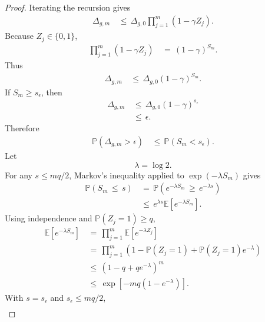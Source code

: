 \documentclass{article} %
\begin{document}
\begin{proof}
Iterating the recursion gives
\begin{align}
\label{eq:app-fifth-contract-proof-product}
\Delta_{g,m}
&\,\le\,
\Delta_{g,0}
\prod_{j=1}^{m}(1-\gamma Z_j).
\end{align}
Because \(Z_j\in\{0,1\}\),
\begin{align}
\label{eq:app-fifth-contract-proof-power}
\prod_{j=1}^{m}(1-\gamma Z_j)
&\,=\,
(1-\gamma)^{S_m}.
\end{align}
Thus
\begin{align}
\label{eq:app-fifth-contract-proof-gap}
\Delta_{g,m}
&\,\le\,
\Delta_{g,0}(1-\gamma)^{S_m}.
\end{align}
If \(S_m\ge s_\epsilon\), then
\begin{align}
\label{eq:app-fifth-contract-proof-success}
\Delta_{g,m}
&\,\le\,
\Delta_{g,0}(1-\gamma)^{s_\epsilon}
\\
&\,\le\,
\epsilon.
\end{align}
Therefore
\begin{align}
\label{eq:app-fifth-contract-proof-tail-start}
\mathbb{P}(\Delta_{g,m}>\epsilon)
&\,\le\,
\mathbb{P}(S_m<s_\epsilon).
\end{align}
Let
\begin{equation}
\label{eq:app-fifth-contract-lambda}
\lambda=\log 2.
\end{equation}
For any \(s\le mq/2\), Markov's inequality applied to \(\exp(-\lambda S_m)\) gives
\begin{align}
\label{eq:app-fifth-contract-proof-mgf}
\mathbb{P}(S_m\,\le\, s)
&\,=\,
\mathbb{P}\!\left(e^{-\lambda S_m}\,\ge\, e^{-\lambda s}\right)
\\
&\,\le\,
e^{\lambda s}
\mathbb{E}[e^{-\lambda S_m}].
\end{align}
Using independence and \(\mathbb{P}(Z_j=1)\ge q\),
\begin{align}
\label{eq:app-fifth-contract-proof-factor}
\mathbb{E}[e^{-\lambda S_m}]
&\,=\,
\prod_{j=1}^{m}
\mathbb{E}[e^{-\lambda Z_j}]
\\
&\,=\,
\prod_{j=1}^{m}
\left(
1-\mathbb{P}(Z_j=1)
+
\mathbb{P}(Z_j=1)e^{-\lambda}
\right)
\\
&\,\le\,
\left(
1-q+qe^{-\lambda}
\right)^m
\\
&\,\le\,
\exp\!\left[-mq(1-e^{-\lambda})\right].
\end{align}
With \(s=s_\epsilon\) and \(s_\epsilon\le mq/2\),
\begin{align}
\label{eq:app-fifth-contract-proof-chernoff}

\end{align}
\end{proof}
\end{document}
